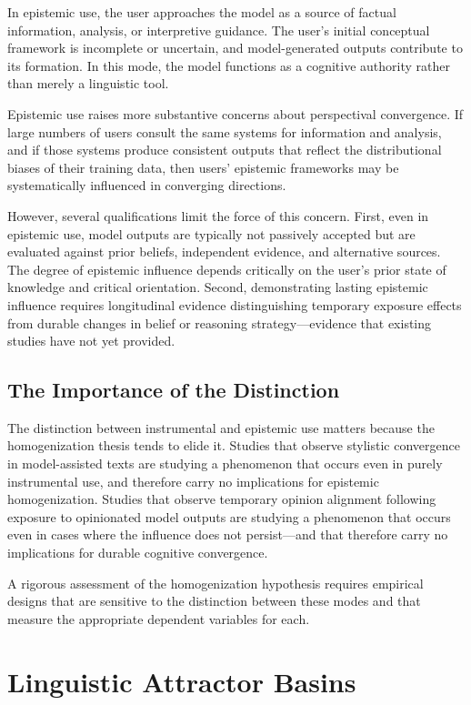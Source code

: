\documentclass[12pt,a4paper]{article}
\theoremstyle{definition}
\theoremstyle{plain}
\theoremstyle{remark}
\begin{document}
In epistemic use, the user approaches the model as a source of factual information, analysis,
or interpretive guidance. The user's initial conceptual framework is incomplete or uncertain,
and model-generated outputs contribute to its formation. In this mode, the model functions
as a cognitive authority rather than merely a linguistic tool.

Epistemic use raises more substantive concerns about perspectival convergence. If large
numbers of users consult the same systems for information and analysis, and if those systems
produce consistent outputs that reflect the distributional biases of their training data,
then users' epistemic frameworks may be systematically influenced in converging directions.

However, several qualifications limit the force of this concern. First, even in epistemic
use, model outputs are typically not passively accepted but are evaluated against prior
beliefs, independent evidence, and alternative sources. The degree of epistemic influence
depends critically on the user's prior state of knowledge and critical orientation.
Second, demonstrating lasting epistemic influence requires longitudinal evidence distinguishing
temporary exposure effects from durable changes in belief or reasoning strategy---evidence
that existing studies have not yet provided.

\subsection{The Importance of the Distinction}

The distinction between instrumental and epistemic use matters because the homogenization
thesis tends to elide it. Studies that observe stylistic convergence in model-assisted texts
are studying a phenomenon that occurs even in purely instrumental use, and therefore carry no
implications for epistemic homogenization. Studies that observe temporary opinion alignment
following exposure to opinionated model outputs are studying a phenomenon that occurs even in
cases where the influence does not persist---and that therefore carry no implications for
durable cognitive convergence.

A rigorous assessment of the homogenization hypothesis requires empirical designs that are
sensitive to the distinction between these modes and that measure the appropriate dependent
variables for each.

\section{Linguistic Attractor Basins}
\label{sec:attractor}
\end{document}
